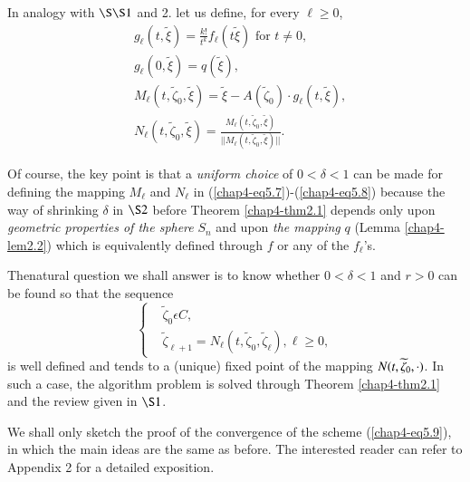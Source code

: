 In analogy with $\S\S 1$ and 2. let us define, for every $\ell \geq
0$,
\begin{align*}
& g_{\ell}(t, \widetilde{\xi}) = \frac{k!}{t^{k}}f_{\ell}
  (t\widetilde{\xi}) \text{ for } t \neq
  0,\tag{5.5}\label{chap4-eq5.5}\\
& g_{\ell}(0, \widetilde{\xi}) = q(\widetilde{\xi}),\tag{5.6}\label{chap4-eq5.6}\\
& M_{\ell}(t, \widetilde{\zeta}_{0}, \widetilde{\xi}) =
  \widetilde{\xi} - A(\widetilde{\zeta}_{0}) \cdot g_{\ell} (t,
  \widetilde{\xi}),\tag{5.7}\label{chap4-eq5.7}\\
& N_{\ell}(t, \widetilde{\zeta}_{0}, \widetilde{\xi}) =
  \frac{M_{\ell}(t, \widetilde{\zeta}_{0},
    \widetilde{\xi})}{||M_{\ell}(t, \widetilde{\zeta}_{0}, \widetilde{\xi})||}.\tag{5.8}\label{chap4-eq5.8}
\end{align*}

Of course, the key point is that a {\em uniform choice} of $0 < \delta
< 1$ can be made for defining the mapping $M_{\ell}$ and $N_{\ell}$ in
(\ref{chap4-eq5.7})-(\ref{chap4-eq5.8}) because the way of shrinking
$\delta$ in $\S 2$ before Theorem \ref{chap4-thm2.1} depends only upon
{\em geometric properties of the sphere} $S_{n}$ and upon {\em the
  mapping} $q$ (Lemma \ref{chap4-lem2.2}) which is equivalently defined
through $f$ or any of the $f_{\ell}$'s.

The\pageoriginale natural question we shall answer is to know whether
$0 < \delta < 1$ and $r > 0$ can be found so that the sequence
\begin{equation*}
\begin{cases}
& \widetilde{\zeta}_{0} \epsilon C,\\
& \widetilde{\zeta}_{\ell + 1} = N_{\ell}(t, \widetilde{\zeta}_{0},
  \widetilde{\zeta}_{\ell}), \ell \geq 0,
\end{cases}\tag{5.9}\label{chap4-eq5.9}
\end{equation*}
is well defined and tends to a (unique) fixed point of the mapping
$N(t,\break\widetilde{\zeta}_{0}, \cdot)$. In such a case, the algorithm
problem is solved through Theorem \ref{chap4-thm2.1} and the review
given in $\S 1$.

We shall only sketch the proof of the convergence of the scheme
(\ref{chap4-eq5.9}), in which the main ideas are the same as
before. The interested reader can refer to Appendix 2 for a detailed
exposition.

